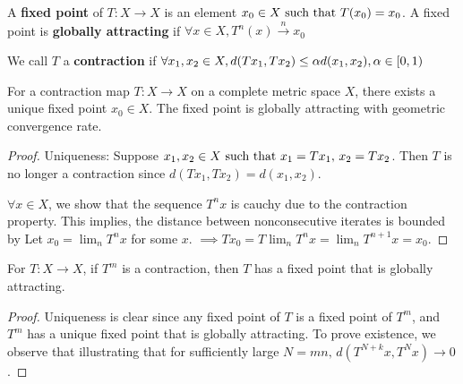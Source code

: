 \begin{definition}
    A \textbf{fixed point} of $T:X\rightarrow X$ is an element $x_0\in X\text{ such that } T(x_0)=x_0$. A fixed point is \textbf{globally attracting} if $\forall x\in X, T^n(x)\xrightarrow{n}x_0$
\end{definition}
We call $T$ a \textbf{contraction} if $\forall x_1,x_2\in X, d(Tx_1,Tx_2)\leq \alpha d(x_1,x_2),\alpha\in[0,1)$
\begin{theorem}
    For a contraction map $T:X\rightarrow X$ on a complete metric space $X$, there exists a unique fixed point $x_0\in X$. The fixed point is globally attracting with geometric convergence rate.
\end{theorem}
\begin{proof}
    Uniqueness: Suppose $x_1,x_2\in X\text{ such that } x_1=Tx_1,\,x_2=Tx_2$. Then $T$ is no longer a contraction since $d(Tx_1,Tx_2)=d(x_1,x_2)$.
    
    $\forall x\in X$, we show that the sequence $T^nx$ is cauchy due to the contraction property.
    This implies, the distance between nonconsecutive iterates is bounded by
    Let $x_0=\lim_n T^nx$ for some $x$. $\implies Tx_0=T\lim_n T^nx = \lim_n T^{n+1}x= x_0$.
\end{proof}

\begin{theorem}
    For $T:X\rightarrow X$, if $T^m$ is a contraction, then $T$ has a fixed point that is globally attracting.
\end{theorem}
\begin{proof}
    Uniqueness is clear since any fixed point of $T$ is a fixed point of $T^m$, and $T^m$ has a unique fixed point that is globally attracting. To prove existence, we observe that
    illustrating that for sufficiently large $N=mn,\,d\left(T^{N+k}x,T^Nx\right)\rightarrow0$.
\end{proof}

